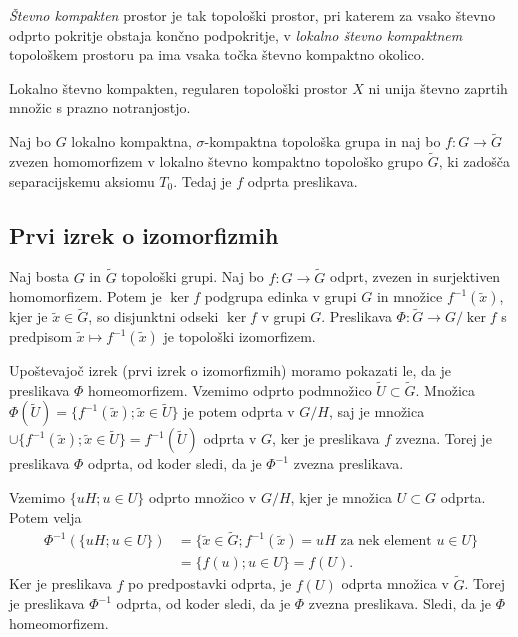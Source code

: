 \documentclass[mat1]{fmfdelo}
\begin{document}
\begin{opomba}
\emph{Števno kompakten} prostor je tak topološki prostor, pri katerem za vsako števno odprto pokritje obstaja končno podpokritje, v \emph{lokalno števno kompaktnem} topološkem prostoru pa ima vsaka točka števno kompaktno okolico. 
\end{opomba}

\begin{trditev}\label{trd:kompni}
Lokalno števno kompakten, regularen topološki prostor $X$ ni unija števno zaprtih množic s prazno notranjostjo.
\end{trditev}

\begin{trditev}\label{trd:kompodp}
Naj bo $G$ lokalno kompaktna, $\sigma$-kompaktna topološka grupa in naj bo $f\colon G \to \widetilde{G}$ zvezen homomorfizem v lokalno števno kompaktno topološko grupo $\widetilde{G}$, ki zadošča separacijskemu aksiomu $T_0$. Tedaj je $f$ odprta preslikava.
\end{trditev}

\subsection{Prvi izrek o izomorfizmih}
\begin{izrek}\label{izr:prvitopizrek}
Naj bosta $G$ in $\widetilde{G}$ topološki grupi. Naj bo $f\colon G \to \widetilde{G}$ odprt, zvezen in surjektiven homomorfizem. Potem je $\ker f$ podgrupa edinka v grupi $G$ in množice $f^{-1}(\tilde{x})$, kjer je $\tilde{x} \in \widetilde{G}$, so disjunktni odseki $\ker f$ v grupi $G$. Preslikava $\Phi\colon\widetilde{G} \to G/\ker f$ s predpisom $\tilde{x} \mapsto f^{-1}(\tilde{x})$ je topološki izomorfizem.
\end{izrek}

\begin{dokaz}
Upoštevajoč izrek (prvi izrek o izomorfizmih) moramo pokazati le, da je preslikava $\Phi$ homeomorfizem. Vzemimo odprto podmnožico $\widetilde{U} \subset \widetilde{G}$. Množica $\Phi(\widetilde{U}) = \lbrace f^{-1}(\tilde{x}) ; \tilde{x} \in \widetilde{U} \rbrace$ je potem odprta v $G/H$, saj je množica $\cup\lbrace f^{-1}(\tilde{x}) ; \tilde{x} \in \widetilde{U} \rbrace = f^{-1}(\widetilde{U})$ odprta v $G$, ker je preslikava $f$ zvezna. Torej je preslikava $\Phi$ odprta, od koder sledi, da je $\Phi^{-1}$ zvezna preslikava.

Vzemimo $\lbrace uH ; u \in U \rbrace$ odprto množico v $G/H$, kjer je množica $U \subset G$ odprta. Potem velja
\begin{align*}
\Phi^{-1}(\lbrace uH ; u \in U \rbrace) &= \lbrace \tilde{x} \in \widetilde{G} ; f^{-1}(\tilde{x}) = uH \text{ za nek element } u \in U \rbrace \\
&= \lbrace f(u) ; u \in U \rbrace = f(U).
\end{align*}
Ker je preslikava $f$ po predpostavki odprta, je $f(U)$ odprta množica v $\widetilde{G}$. Torej je preslikava $\Phi^{-1}$ odprta, od koder sledi, da je $\Phi$ zvezna preslikava. Sledi, da je $\Phi$ homeomorfizem.
\end{dokaz}
\end{document}

